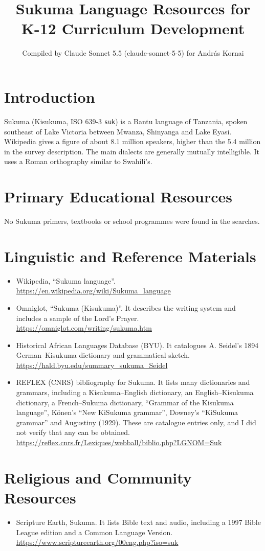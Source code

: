 \documentclass[12pt]{article}
\title{Sukuma Language Resources for K-12 Curriculum Development}
\author{Compiled by Claude Sonnet 5.5 (claude-sonnet-5-5) for Andr\'as Kornai}
\date{}
\begin{document}
\maketitle

\section{Introduction}
Sukuma (Kisukuma, ISO 639-3 \texttt{suk}) is a Bantu language of Tanzania, spoken southeast of Lake Victoria between Mwanza, Shinyanga and Lake Eyasi. Wikipedia gives a figure of about 8.1 million speakers, higher than the 5.4 million in the survey description. The main dialects are generally mutually intelligible. It uses a Roman orthography similar to Swahili's.

\section{Primary Educational Resources}
No Sukuma primers, textbooks or school programmes were found in the searches.

\section{Linguistic and Reference Materials}
\begin{itemize}
\item Wikipedia, ``Sukuma language''. \url{https://en.wikipedia.org/wiki/Sukuma_language}
\item Omniglot, ``Sukuma (Kisukuma)''. It describes the writing system and includes a sample of the Lord's Prayer. \url{https://omniglot.com/writing/sukuma.htm}
\item Historical African Languages Database (BYU). It catalogues A. Seidel's 1894 German--Kisukuma dictionary and grammatical sketch. \url{https://hald.byu.edu/summary_sukuma_Seidel}
\item REFLEX (CNRS) bibliography for Sukuma. It lists many dictionaries and grammars, including a Kisukuma--English dictionary, an English--Kisukuma dictionary, a French--Sukuma dictionary, ``Grammar of the Kisukuma language'', K\"onen's ``New KiSukuma grammar'', Downey's ``KiSukuma grammar'' and Augustiny (1929). These are catalogue entries only, and I did not verify that any can be obtained. \url{https://reflex.cnrs.fr/Lexiques/webball/biblio.php?LGNOM=Suk}
\end{itemize}

\section{Religious and Community Resources}
\begin{itemize}
\item Scripture Earth, Sukuma. It lists Bible text and audio, including a 1997 Bible League edition and a Common Language Version. \url{https://www.scriptureearth.org/00eng.php?iso=suk}
\end{itemize}
\end{document}
